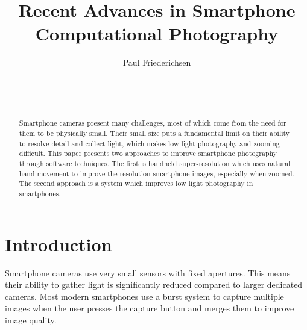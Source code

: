 \documentclass{sig-alternate}
\begin{document}

\title{Recent Advances in Smartphone Computational Photography}


\author{
\alignauthor
Paul Friederichsen\\
	\\
	\\
	\\
}

\maketitle

\begin{abstract}

Smartphone cameras present many challenges, most of which come from the need for them to be physically small. Their small size puts a fundamental limit on their ability to resolve detail and collect light, which makes low-light photography and zooming difficult. This paper presents two approaches to improve smartphone photography through software techniques. The first is handheld super-resolution which uses natural hand movement to improve the resolution smartphone images, especially when zoomed. The second approach is a system which improves low light photography in smartphones.

\end{abstract}


\section{Introduction}

Smartphone cameras use very small sensors with fixed apertures. This means their ability to gather light is significantly reduced compared to larger dedicated cameras. Most modern smartphones use a burst system to capture multiple images when the user presses the capture button and merges them to improve image quality. 
\end{document}
